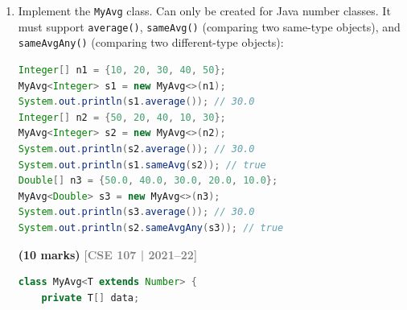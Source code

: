 \documentclass[12pt,a3paper]{article}
\newcommand{\yr}[1]{\hfill\textcolor{gray}{\small\textbf{[#1]}}}
\newcommand{\mk}[1]{\textcolor{orange!70!black}{\small\textbf{(#1 marks)}}}
\begin{document}
\begin{enumerate}
\begin{tcolorbox}[enhanced,breakable,ansbox,
  colback=cG!4,colframe=cG,boxrule=0.8pt,arc=5pt,
  title={\textbf{Answer --- Employee Sort: id, name, age}},
  fonttitle=\bfseries\color{white},colbacktitle=cG]
\begin{lstlisting}[language=Java]
import java.util.*;

class Employee implements Comparable<Employee> {
    int id; String name; int age;
    Employee(int id, String name, int age) {
        this.id=id; this.name=name; this.age=age;
    }

    @Override
    public int compareTo(Employee o) {
        int c = Integer.compare(this.id, o.id);       // asc id
        if (c != 0) return c;
        c = this.name.compareTo(o.name);              // lex name
        if (c != 0) return c;
        return Integer.compare(this.age, o.age);      // asc age
    }

    @Override
    public String toString() {
        return id + "-" + name + "(" + age + ")";
    }
}

class EmployeeSort {
    public static void main(String[] args) {
        ArrayList<Employee> list = new ArrayList<>();
        list.add(new Employee(2, "Zara",  25));
        list.add(new Employee(1, "Bob",   22));
        list.add(new Employee(1, "Alice", 30));
        list.add(new Employee(1, "Alice", 25));

        Collections.sort(list);
        list.forEach(System.out::println);
    }
}
\end{lstlisting}
\textbf{Output:}
\begin{verbatim}
1-Alice(25)
1-Alice(30)
1-Bob(22)
2-Zara(25)
\end{verbatim}
\end{tcolorbox}

\item Implement the \texttt{MyAvg} class. Can only be created for Java number classes. It must support \texttt{average()}, \texttt{sameAvg()} (comparing two same-type objects), and \texttt{sameAvgAny()} (comparing two different-type objects):
\begin{lstlisting}[language=Java]
Integer[] n1 = {10, 20, 30, 40, 50};
MyAvg<Integer> s1 = new MyAvg<>(n1);
System.out.println(s1.average()); // 30.0
Integer[] n2 = {50, 20, 40, 10, 30};
MyAvg<Integer> s2 = new MyAvg<>(n2);
System.out.println(s2.average()); // 30.0
System.out.println(s1.sameAvg(s2)); // true
Double[] n3 = {50.0, 40.0, 30.0, 20.0, 10.0};
MyAvg<Double> s3 = new MyAvg<>(n3);
System.out.println(s3.average()); // 30.0
System.out.println(s2.sameAvgAny(s3)); // true
\end{lstlisting}
\mk{10}
\yr{CSE 107 | 2021--22}

\begin{tcolorbox}[enhanced,breakable,ansbox,
  colback=cG!4,colframe=cG,boxrule=0.8pt,arc=5pt,
  title={\textbf{Answer --- MyAvg with sameAvg and sameAvgAny}},
  fonttitle=\bfseries\color{white},colbacktitle=cG]
\begin{lstlisting}[language=Java]
class MyAvg<T extends Number> {
    private T[] data;


\end{lstlisting}
\end{tcolorbox}
\end{enumerate}
\end{document}
